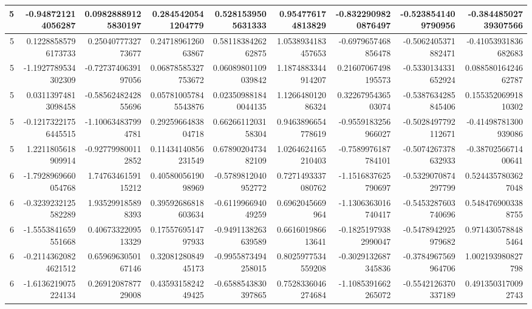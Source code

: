 \documentclass{jlreq}
\numberwithin{equation}{section}
\begin{document}
\begin{table}[H]
{\begin{tabular}{|r|r|r|r|r|r|r|r|r|}
      5 & -0.948721214056287    & 0.09828889125830197   & 0.2845420541204779   & 0.5281539505631333   & 0.954776174813829     & -0.8322909820876497   & -0.5238541409790956   & -0.38448502739307566  \\ \hline
      5 & 0.12288585796173733   & 0.2504077732773677    & 0.2471896126063867   & 0.5811838426262875   & 1.0538934183457653    & -0.6979657468856478   & -0.5062405371882471   & -0.41053931836682683  \\ \hline
      5 & -1.1927789534302309   & -0.7273740639197056   & 0.06878585327753672  & 0.06089801109039842  & 1.1874883344914207    & 0.21607067498195573   & -0.5330134331652924   & 0.08858016424662787   \\ \hline
      5 & 0.03113974813098458   & -0.5856248242855696   & 0.057810057845543876 & 0.023509881840044135 & 1.126648012086324     & 0.3226795436503074    & -0.5387634285845406   & 0.15535206991810302   \\ \hline
      5 & -0.12173221756445515  & -1.100634837994781    & 0.2925966483804718   & 0.6626611203158304   & 0.9463896654778619    & -0.9559183256966027   & -0.5028497792112671   & -0.41498781300939086  \\ \hline
      5 & 1.2211805618909914    & -0.927799800112852    & 0.11434140856231549  & 0.6789020473482109   & 1.0264624165210403    & -0.7589976187784101   & -0.5074267378632933   & -0.3870256671400641   \\ \hline
      6 & -1.7928969660054768   & 1.7476346159115212    & 0.4058005619098969   & -0.5789812040952772  & 0.7271493337080762    & -1.1516837625790697   & -0.5329070874297799   & 0.5244357803627048    \\ \hline
      6 & -0.3239232125582289   & 1.935299185898393     & 0.39592686818603634  & -0.611996694049259   & 0.6962045669964       & -1.1306363016740417   & -0.5453287603740696   & 0.5484769003388755    \\ \hline
      6 & -1.5553841659551668   & 0.4067332209513329    & 0.1755769514797933   & -0.9491138263639589  & 0.661601986613641     & -0.18251979382990047  & -0.5478942925979682   & 0.9714305788485464    \\ \hline
      6 & -0.21143620824621512  & 0.6596963050167146    & 0.3208128084945173   & -0.9955873494258015  & 0.8025977534559208    & -0.3029132687345836   & -0.3784967569964706   & 1.002193980827798     \\ \hline
      6 & -1.6136219075224134   & 0.2691208787729008    & 0.4359315824249425   & -0.6588543830397865  & 0.7528336046274684    & -1.1085391662265072   & -0.5542126370337189   & 0.4913503170092743    \\ \hline

\end{tabular}}
\end{table}
\end{document}
